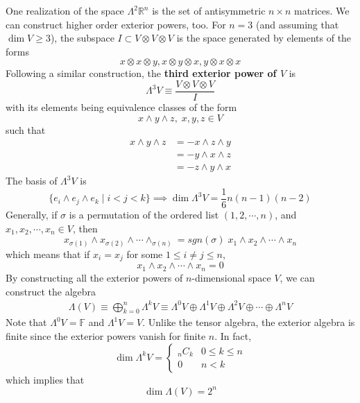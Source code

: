   One realization of the space $\Lambda^2 \mathbb{R}^n$ is the set of antisymmetric $n \times n$ matrices. We can construct higher order exterior powers, too. For $n = 3$ (and assuming that $\dim{V} \geq 3$), the subspace $I \subset V \otimes V \otimes V$ is the space generated by elements of the forms
  \[x \otimes x \otimes y, x \otimes y \otimes x, y \otimes x \otimes x\]
  Following a similar construction, the \textbf{third exterior power of $V$} is
  \[\Lambda^3 V \equiv \frac{V \otimes V \otimes V}{I}\]
  with its elements being equivalence classes of the form
  \[x \wedge y \wedge z,\; x, y, z \in V\]
  such that
  \begin{align*}
    x \wedge y \wedge z & = - x \wedge z \wedge y \\
    & = - y \wedge x \wedge z \\
    & = - z \wedge y \wedge x
  \end{align*}
  The basis of $\Lambda^3 V$ is
  \[\{e_i \wedge e_j \wedge e_k \; | \; i < j < k\} \implies \dim{\Lambda^3 V} = \frac{1}{6} n (n-1) (n-2)\]
  Generally, if $\sigma$ is a permutation of the ordered list $(1, 2, \cdots, n)$, and $x_1, x_2, \cdots, x_n \in V$, then 
  \[x_{\sigma(1)} \wedge x_{\sigma(2)} \wedge \cdots \wedge_{\sigma(n)} = sgn(\sigma) \; x_1 \wedge x_2 \wedge \cdots \wedge x_n\]
  which means that if $x_i = x_j$ for some $1 \leq i \neq j \leq n$, 
  \[x_1 \wedge x_2 \wedge \cdots \wedge x_n = 0\]
  By constructing all the exterior powers of $n$-dimensional space $V$, we can construct the algebra 
  \begin{align*}
    \Lambda(V) \equiv \bigoplus_{k=0}^n \Lambda^k V \equiv \Lambda^0 V \oplus \Lambda^1 V \oplus \Lambda^2 V \oplus \cdots \oplus \Lambda^n V 
  \end{align*}
  Note that $\Lambda^0 V = \mathbb{F}$ and $\Lambda^1 V = V$. Unlike the tensor algebra, the exterior algebra is finite since the exterior powers vanish for finite $n$. In fact, 
  \[ \dim{\Lambda^k V} = \begin{cases}
  _n C_k & 0 \leq k \leq n \\
  0 & n < k
  \end{cases}\]
  which implies that 
  \[\dim{\Lambda(V)} = 2^n \]

